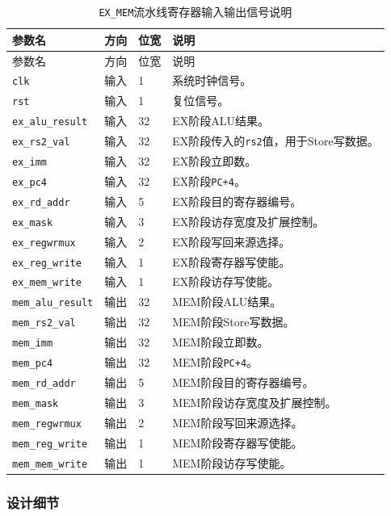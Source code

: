 \documentclass[12pt,a4paper]{ctexart}
\newcommand{\code}[1]{\texttt{#1}}
\begin{document}
{\footnotesize
\renewcommand{\arraystretch}{1.12}
\begin{longtable}{p{3.2cm}p{1.5cm}p{2.1cm}p{7.0cm}}
\caption{\code{EX\_MEM}流水线寄存器输入输出信号说明}\\
\toprule
参数名 & 方向 & 位宽 & 说明 \\
\midrule
\endfirsthead
\toprule
参数名 & 方向 & 位宽 & 说明 \\
\midrule
\endhead
\code{clk} & 输入 & 1 & 系统时钟信号。 \\
\code{rst} & 输入 & 1 & 复位信号。 \\
\code{ex\_alu\_result} & 输入 & 32 & EX阶段ALU结果。 \\
\code{ex\_rs2\_val} & 输入 & 32 & EX阶段传入的\code{rs2}值，用于Store写数据。 \\
\code{ex\_imm} & 输入 & 32 & EX阶段立即数。 \\
\code{ex\_pc4} & 输入 & 32 & EX阶段\code{PC+4}。 \\
\code{ex\_rd\_addr} & 输入 & 5 & EX阶段目的寄存器编号。 \\
\code{ex\_mask} & 输入 & 3 & EX阶段访存宽度及扩展控制。 \\
\code{ex\_regwrmux} & 输入 & 2 & EX阶段写回来源选择。 \\
\code{ex\_reg\_write} & 输入 & 1 & EX阶段寄存器写使能。 \\
\code{ex\_mem\_write} & 输入 & 1 & EX阶段访存写使能。 \\
\code{mem\_alu\_result} & 输出 & 32 & MEM阶段ALU结果。 \\
\code{mem\_rs2\_val} & 输出 & 32 & MEM阶段Store写数据。 \\
\code{mem\_imm} & 输出 & 32 & MEM阶段立即数。 \\
\code{mem\_pc4} & 输出 & 32 & MEM阶段\code{PC+4}。 \\
\code{mem\_rd\_addr} & 输出 & 5 & MEM阶段目的寄存器编号。 \\
\code{mem\_mask} & 输出 & 3 & MEM阶段访存宽度及扩展控制。 \\
\code{mem\_regwrmux} & 输出 & 2 & MEM阶段写回来源选择。 \\
\code{mem\_reg\_write} & 输出 & 1 & MEM阶段寄存器写使能。 \\
\code{mem\_mem\_write} & 输出 & 1 & MEM阶段访存写使能。 \\
\bottomrule
\end{longtable}
}

\subsubsection*{设计细节}
\end{document}
